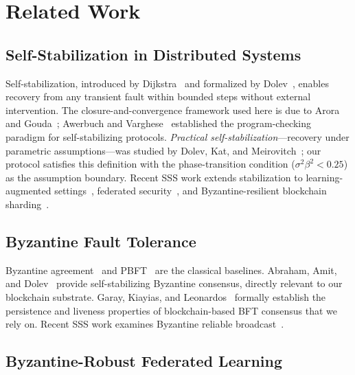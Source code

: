 \section{Related Work}
\label{sec:related}

\subsection{Self-Stabilization in Distributed Systems}

Self-stabilization, introduced by Dijkstra~\cite{dijkstra_self_stab} and formalized
by Dolev~\cite{dolev_self_stab}, enables recovery from any transient fault within bounded
steps without external intervention.
The closure-and-convergence framework used here is due to Arora and
Gouda~\cite{arora_gouda}; Awerbuch and Varghese~\cite{awerbuch_varghese} established the
program-checking paradigm for self-stabilizing protocols.
\emph{Practical self-stabilization}---recovery under parametric assumptions---was
studied by Dolev, Kat, and Meirovitch~\cite{dolev_kat_practical}; our protocol satisfies
this definition with the phase-transition condition ($\sigma^2\beta^2 < 0.25$) as the
assumption boundary.
Recent SSS work extends stabilization to learning-augmented settings~\cite{sss_ml_routing},
federated security~\cite{sss_fl_leakage}, and Byzantine-resilient
blockchain sharding~\cite{sss_blockchain_sharding}.

\subsection{Byzantine Fault Tolerance}

Byzantine agreement~\cite{byzantine_generals} and PBFT~\cite{bft_consensus} are the
classical baselines.
Abraham, Amit, and Dolev~\cite{abraham_byz_stab} provide self-stabilizing Byzantine
consensus, directly relevant to our blockchain substrate.
Garay, Kiayias, and Leonardos~\cite{garay_backbone} formally establish the persistence
and liveness properties of blockchain-based BFT consensus that we rely on.
Recent SSS work examines Byzantine reliable broadcast~\cite{sss_byz_broadcast,sss_byz_counter}.

\subsection{Byzantine-Robust Federated Learning}


